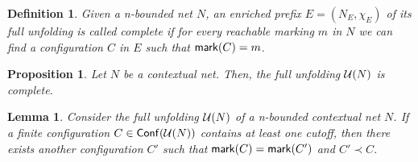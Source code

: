 \documentclass{article}
\newtheorem{definition}{Definition}
\newtheorem{proposition}{Proposition}
\newtheorem{lemma}{Lemma}
\newcommand{\conf}[1]{\ensuremath{\mathsf{Conf}(#1)}}
\begin{document}

\begin{definition}  Given a n-bounded net $N$, an enriched prefix $E = (N_E,
\chi_E)$ of its full unfolding is called \emph{complete} if for every reachable
marking $m$ in $N$ we can find a configuration $C$ in $E$ such that
$\mathsf{mark }{(C)} = m$.
\end{definition}

\begin{proposition} \label{pro:unfolding.complete} Let $N$ be a contextual net.
Then, the full unfolding $\mathcal{U}(N)$ is complete.
\end{proposition} 

\begin{lemma}
\label{lem:cutoff.elimination}
Consider the full unfolding $\mathcal{U}(N)$ of a n-bounded contextual net $N$.  If a
finite configuration $C \in \conf{\unf{N}}$ contains at least one cutoff, then
there exists another configuration $C'$ such that $\mathsf{mark }{(C)} = \mathsf{mark }{(C')}$
and $C' \prec C$.
\end{lemma}
\end{document}
